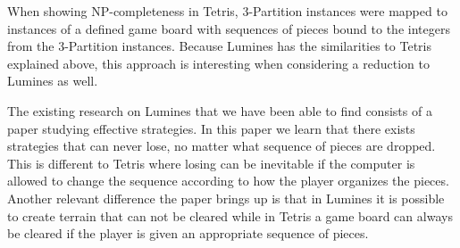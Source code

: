 When showing NP-completeness in Tetris, 3-Partition instances were mapped to instances of a defined game board with sequences of pieces bound to the integers from the 3-Partition instances. Because Lumines has the similarities to Tetris explained above, this approach is interesting when considering a reduction to Lumines as well.

The existing research on Lumines that we have been able to find consists of a paper studying effective strategies. In this paper we learn that there exists strategies that can never lose, no matter what sequence of pieces are dropped. This is different to Tetris where losing can be inevitable if the computer is allowed to change the sequence according to how the player organizes the pieces. Another relevant difference the paper brings up is that in Lumines it is possible to create terrain that can not be cleared while in Tetris a game board can always be cleared if the player is given an appropriate sequence of pieces.


